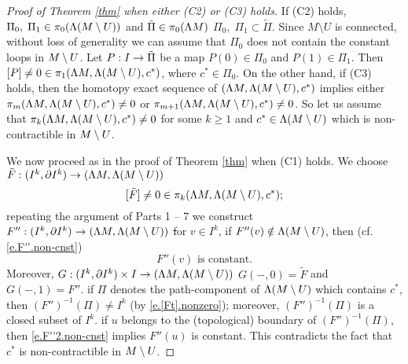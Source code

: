 \documentclass[11pt,twoside]{article}
\begin{document}
\begin{proof}[Proof of Theorem \ref{thm} when either (C2) or (C3) holds] If (C2) holds, \te \(\Pi_0,\;\Pi_1\in \pi_0(\Lambda(M\setminus U))\) and \(\tilde{\Pi}\in \pi_0(\Lambda M)\) \st \(\Pi_0,\;\Pi_1\subset \tilde{\Pi}\). Since \(M\setminus U\) is connected, without loss of generality we can assume that \(\Pi_0\) does not contain the constant loops in \(M \setminus U\). Let \(P:I\rightarrow \tilde{\Pi} \) be a \cts map \st \(P(0)\in \Pi_0\) and \(P(1)\in \Pi_1\). Then \([P]\neq 0\in \pi_1(\Lambda M, \Lambda (M \setminus U),c^*)\), where \(c^*\in \Pi_0\). On the other hand, if (C3) holds, then the homotopy exact sequence of \((\Lambda M, \Lambda (M \setminus U),c^*)\) implies either \(\pi_m(\Lambda M, \Lambda (M \setminus U),c^*)\neq 0\) or \(\pi_{m+1}(\Lambda M, \Lambda (M \setminus U),c^*)\neq 0\). So let  us assume that \(\pi_k(\Lambda M, \Lambda (M \setminus U),c^*)\neq 0\) for some \(k\geq 1\) and \(c^*\in \Lambda (M \setminus U)\) which is non-contractible in \(M \setminus U\).
	
We now proceed as in the proof of Theorem \ref{thm} when (C1) holds. We choose \(\tilde{F}:(I^k,\partial I^k)\rightarrow (\Lambda M, \Lambda (M\setminus U))\) \sot 
\begin{equation}\label{e.[Ft].nonzero}
[\tilde{F}]\neq 0\in \pi_k(\Lambda M, \Lambda (M\setminus U),c^*);
\end{equation}
repeating the argument of Parts 1 -- 7 we construct $F'':(I^k,\partial I^k)\rightarrow (\Lambda M, \Lambda (M\setminus U))$ \st for $v\in I^k$, if \(F''(v)\notin \Lambda (M \setminus U)\), then (cf. \eqref{e.F''.non-cnst})
\begin{equation}\label{e.F''2.non-cnst}
F''(v) \text{ is constant.}
\end{equation}
Moreover, \tes \(G: (I^k,\partial I^k)\times I\rightarrow (\Lambda M, \Lambda (M\setminus U))\) \w \(G(-,0)=\tilde{F}\) and \(G(-,1)=F''\). \tf if \(\Pi\) denotes the path-component of \(\Lambda(M \setminus U)\) which contains \(c^*\), then \((F'')^{-1}(\Pi)\neq I^k\) (by \eqref{e.[Ft].nonzero}); moreover, \((F'')^{-1}(\Pi)\) is a closed subset of \(I^k\). \tf if $u$ belongs to the (topological) boundary of \((F'')^{-1}(\Pi)\), then \eqref{e.F''2.non-cnst} implies \(F''(u)\) is constant. This contradicts the fact that \(c^*\) is non-contractible in \(M \setminus U\).

\end{proof}
\end{document}
